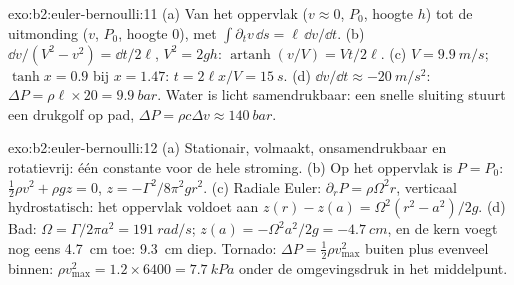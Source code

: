 \begin{solution}{exo:b2:euler-bernoulli:11}
(a) Van het oppervlak ($v \approx 0$, $P_0$, hoogte $h$) tot de uitmonding
($v$, $P_0$, hoogte $0$), met $\int\partial_tv\,\dd s = \ell\,\dd v/\dd t$.
(b) $\dd v/(V^2 -
v^2) = \dd t/2\ell$, $V^2 = 2gh$:
$\operatorname{artanh}(v/V) = Vt/2\ell$. (c) $V =
\qty{9.9}{m/s}$;
$\tanh x = 0.9$ bij $x = 1.47$: $t = 2\ell x/V = \qty{15}{s}$. (d)
$\dd v/\dd t \approx \qty{-20}{m/s^2}$:
$\Delta P = \rho\ell \times 20 = \qty{9.9}{bar}$. Water is licht
samendrukbaar: een snelle sluiting stuurt een drukgolf op pad,
$\Delta P = \rho c\Delta v \approx \qty{140}{bar}$.
\end{solution}

\begin{solution}{exo:b2:euler-bernoulli:12}
(a) Stationair, volmaakt, onsamendrukbaar en rotatievrij: één constante voor
de hele stroming. (b) Op het oppervlak is $P = P_0$:
$\tfrac12\rho v^2 + \rho gz =
0$, $z = -\Gamma^2/8\pi^2gr^2$. (c) Radiale
Euler: $\partial_rP = \rho\Omega^2r$, verticaal hydrostatisch: het oppervlak
voldoet aan $z(r) - z(a) = \Omega^2(r^2 -
a^2)/2g$. (d) Bad:
$\Omega = \Gamma/2\pi a^2 = \qty{191}{rad/s}$;
$z(a) = -\Omega^2a^2/
2g = \qty{-4.7}{cm}$, en de kern voegt nog eens
\qty{4.7}{cm} toe: \qty{9.3}{cm} diep. Tornado:
$\Delta P = \tfrac12\rho v_{\max}^2$ buiten plus evenveel binnen:
$\rho v_{\max}^2 = 1.2 \times 6400 = \qty{7.7}{kPa}$ onder de omgevingsdruk
in het middelpunt.
\end{solution}

